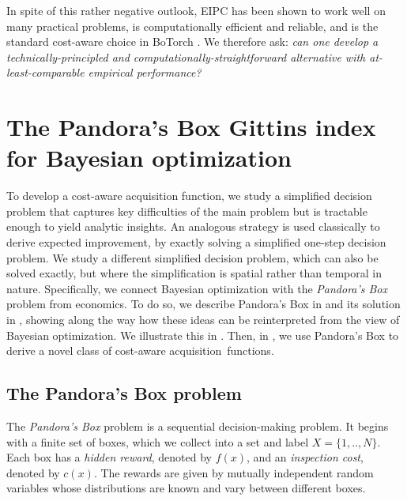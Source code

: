 \documentclass{article}
\begin{document}
In spite of this rather negative outlook, EIPC has been shown to work well on many practical problems, is computationally efficient and reliable, and is the standard cost-aware choice in BoTorch \cite{balandat2020botorch}.
We therefore ask: \emph{can one develop a technically-principled and computationally-straightforward alternative with at-least-comparable empirical performance?}



\section{The Pandora's Box Gittins index for Bayesian optimization}
\label{sec:Gittins}

To develop a cost-aware acquisition function, we study a simplified decision problem that captures key difficulties of the main problem but is tractable enough to yield analytic insights.
An analogous strategy is used classically to derive expected improvement, by exactly solving a simplified one-step decision problem.
We study a different simplified decision problem, which can also be solved exactly, but where the simplification is spatial rather than temporal in nature.
Specifically, we connect Bayesian optimization with the \emph{Pandora's Box} problem from economics.
To do so, we describe Pandora's Box in  and its solution in , showing along the way how these ideas can be reinterpreted from the view of Bayesian optimization. 
We illustrate this in .
Then, in , we use Pandora's Box to derive a novel class of cost-aware acquisition~functions.

\subsection{The Pandora's Box problem}
\label{sec:Gittins:pandora}

The \emph{Pandora's Box} problem \cite{weitzman1979optimal, gittins2011multiarmed} is a sequential decision-making problem.
It begins with a finite set of boxes, which we collect into a set and label $X = \{1,..,N\}$.
Each box has a \emph{hidden reward}, denoted by $f(x)$, and an \emph{inspection cost}, denoted by $c(x)$.
The rewards are given by mutually independent random variables whose distributions are known and vary between different boxes.
\end{document}
